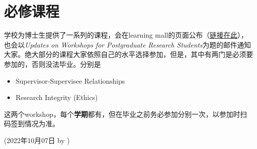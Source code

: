 \section{必修课程}
学校为博士生提供了一系列的课程，会在learning mall的页面公布（\href{https://core.xjtlu.edu.cn/course/view.php?id=847}{链接在此}），也会以\textit{Updates on Workshops for Postgraduate Research Students}为题的邮件通知大家。绝大部分的课程大家依照自己的水平选择参加，但是，其中有两门是必须要参加的，否则没法毕业。分别是

\begin{itemize}
    \item Supervisor-Supervisee Relationships
    \item Research Integrity (Ethics)
\end{itemize}

这两个workshop，每个\textbf{学期}都有，但在毕业之前务必参加分别一次，以参加时扫码签到情况为准。

\begin{flushright}
(2022年10月07日 by \Wu)
\end{flushright}